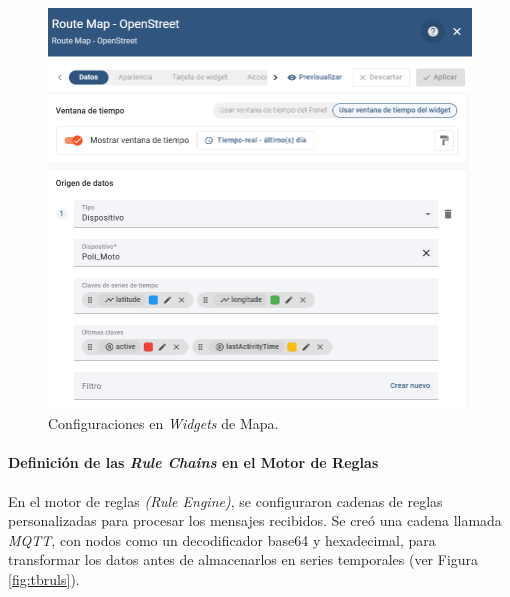 \begin{figure}[H]
\leavevmode
\begin{minipage}{\textwidth}
\begin{center}
\includegraphics[scale=0.5]{./capitulo_04/imagen/tb/configuracion depanel.png}
\caption{Configuraciones en \textit{Widgets} de Mapa. \label{fig:tbpanelconf}}
\end{center}
\end{minipage}
\end{figure}

\paragraph{Definición de las \textit{Rule Chains} en el Motor de Reglas\\}

En el motor de reglas \textit{(Rule Engine)}, se configuraron cadenas de reglas personalizadas para procesar los mensajes recibidos. Se creó una cadena llamada \textit{MQTT}, con nodos como un decodificador base64 y hexadecimal, para transformar los datos antes de almacenarlos en series temporales (ver Figura \ref{fig:tbruls}).

